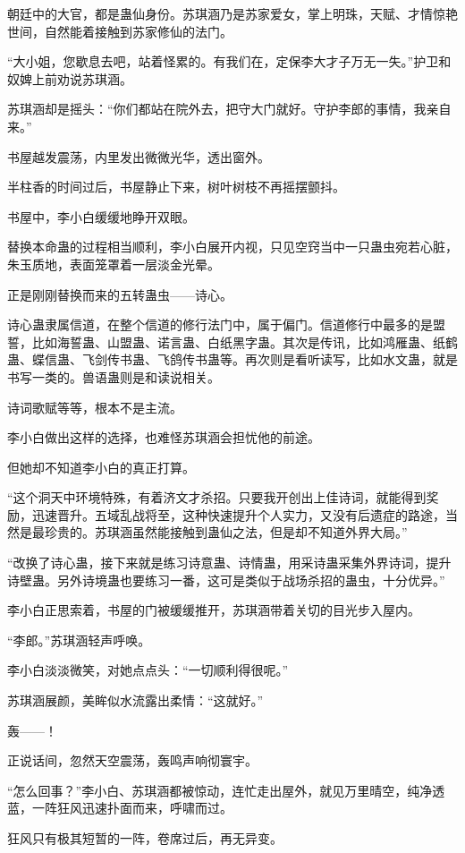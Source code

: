 \begin{this_body}
朝廷中的大官，都是蛊仙身份。苏琪涵乃是苏家爱女，掌上明珠，天赋、才情惊艳世间，自然能着接触到苏家修仙的法门。

“大小姐，您歇息去吧，站着怪累的。有我们在，定保李大才子万无一失。”护卫和奴婢上前劝说苏琪涵。

苏琪涵却是摇头：“你们都站在院外去，把守大门就好。守护李郎的事情，我亲自来。”

书屋越发震荡，内里发出微微光华，透出窗外。

半柱香的时间过后，书屋静止下来，树叶树枝不再摇摆颤抖。

书屋中，李小白缓缓地睁开双眼。

替换本命蛊的过程相当顺利，李小白展开内视，只见空窍当中一只蛊虫宛若心脏，朱玉质地，表面笼罩着一层淡金光晕。

正是刚刚替换而来的五转蛊虫——诗心。

诗心蛊隶属信道，在整个信道的修行法门中，属于偏门。信道修行中最多的是盟誓，比如海誓蛊、山盟蛊、诺言蛊、白纸黑字蛊。其次是传讯，比如鸿雁蛊、纸鹤蛊、蝶信蛊、飞剑传书蛊、飞鸽传书蛊等。再次则是看听读写，比如水文蛊，就是书写一类的。兽语蛊则是和读说相关。

诗词歌赋等等，根本不是主流。

李小白做出这样的选择，也难怪苏琪涵会担忧他的前途。

但她却不知道李小白的真正打算。

“这个洞天中环境特殊，有着济文才杀招。只要我开创出上佳诗词，就能得到奖励，迅速晋升。五域乱战将至，这种快速提升个人实力，又没有后遗症的路途，当然是最珍贵的。苏琪涵虽然能接触到蛊仙之法，但是却不知道外界大局。”

“改换了诗心蛊，接下来就是练习诗意蛊、诗情蛊，用采诗蛊采集外界诗词，提升诗壁蛊。另外诗境蛊也要练习一番，这可是类似于战场杀招的蛊虫，十分优异。”

李小白正思索着，书屋的门被缓缓推开，苏琪涵带着关切的目光步入屋内。

“李郎。”苏琪涵轻声呼唤。

李小白淡淡微笑，对她点点头：“一切顺利得很呢。”

苏琪涵展颜，美眸似水流露出柔情：“这就好。”

轰——！

正说话间，忽然天空震荡，轰鸣声响彻寰宇。

“怎么回事？”李小白、苏琪涵都被惊动，连忙走出屋外，就见万里晴空，纯净透蓝，一阵狂风迅速扑面而来，呼啸而过。

狂风只有极其短暂的一阵，卷席过后，再无异变。


\end{this_body}
